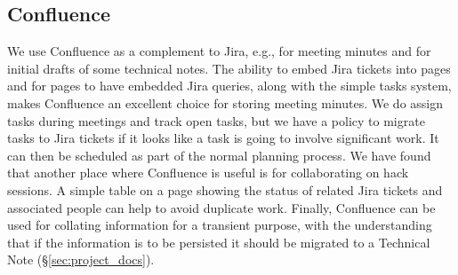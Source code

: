 \subsection{Confluence}
We use Confluence  as a complement to Jira, e.g., for meeting minutes and for initial drafts of some technical notes.
The ability to embed Jira tickets into pages and for pages to have embedded Jira queries, along with the simple tasks system, makes Confluence an excellent choice for storing meeting minutes.
We do assign tasks during meetings and track open tasks, but we have a policy to migrate tasks to Jira tickets if it looks like a task is going to involve significant work.
It can then be scheduled as part of the normal planning process.
We have found that another place where Confluence is useful is for collaborating on hack sessions.
A simple table on a page showing the status of related Jira tickets and associated people can help to avoid duplicate work.
Finally, Confluence can be used for collating information for a transient purpose, with the understanding that if the information is to be persisted it should be migrated to a Technical Note (\S\ref{sec:project_docs}).
